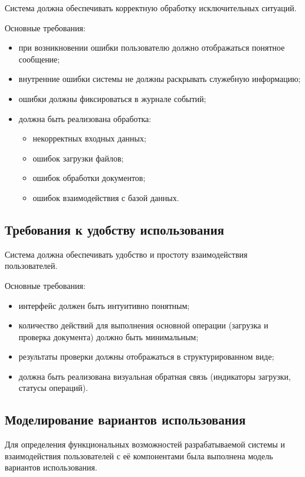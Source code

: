 Система должна обеспечивать корректную обработку исключительных ситуаций.

Основные требования:

\begin{itemize}
	\item при возникновении ошибки пользователю должно отображаться понятное сообщение;
	\item внутренние ошибки системы не должны раскрывать служебную информацию;
	\item ошибки должны фиксироваться в журнале событий;
	\item должна быть реализована обработка:
	\begin{itemize}
		\item некорректных входных данных;
		\item ошибок загрузки файлов;
		\item ошибок обработки документов;
		\item ошибок взаимодействия с базой данных.
	\end{itemize}
\end{itemize}

\subsection{Требования к удобству использования}

Система должна обеспечивать удобство и простоту взаимодействия пользователей.

Основные требования:

\begin{itemize}
	\item интерфейс должен быть интуитивно понятным;
	\item количество действий для выполнения основной операции (загрузка и проверка документа) должно быть минимальным;
	\item результаты проверки должны отображаться в структурированном виде;
	\item должна быть реализована визуальная обратная связь (индикаторы загрузки, статусы операций).
\end{itemize}

\subsection{Моделирование вариантов использования}

Для определения функциональных возможностей разрабатываемой системы и взаимодействия пользователей с её компонентами была выполнена модель вариантов использования.

